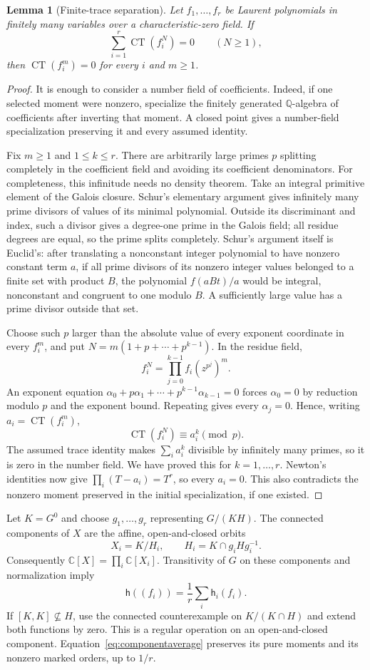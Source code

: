 \documentclass[11pt]{article}
\numberwithin{equation}{section}
\newtheorem{lemma}[theorem]{Lemma}
\theoremstyle{definition}
\theoremstyle{remark}
\newcommand{\C}{\mathbb C}
\newcommand{\Q}{\mathbb Q}
\newcommand{\h}{\mathsf h}
\newcommand{\CT}{\operatorname{CT}}
\begin{document}
\begin{lemma}[Finite-trace separation]\label{lem:finitetrace}
Let $f_1,\ldots,f_r$ be Laurent polynomials in finitely many variables
over a characteristic-zero field. If
\[
 \sum_{i=1}^r\CT(f_i^N)=0\qquad(N\geq1),
\]
then $\CT(f_i^m)=0$ for every $i$ and $m\geq1$.
\end{lemma}
\begin{proof}
It is enough to consider a number field of coefficients. Indeed, if
one selected moment were nonzero, specialize the finitely generated
$\Q$-algebra of coefficients after inverting that moment. A closed
point gives a number-field specialization preserving it and every
assumed identity.

Fix $m\geq1$ and $1\leq k\leq r$. There are arbitrarily large primes
$p$ splitting completely in the coefficient field and avoiding its
coefficient denominators. For completeness, this infinitude needs no
density theorem. Take an integral primitive element of the Galois
closure. Schur's elementary argument gives infinitely many prime
divisors of values of its minimal polynomial. Outside its discriminant
and index, such a divisor gives a degree-one prime in the Galois field;
all residue degrees are equal, so the prime splits completely.
Schur's argument itself is Euclid's: after translating a nonconstant
integer polynomial to have nonzero constant term $a$, if all prime divisors of its nonzero integer values belonged to a finite
set with product $B$, the polynomial
$f(aBt)/a$ would be integral, nonconstant and congruent to one modulo
$B$. A sufficiently large value has a prime divisor outside that set.

Choose such $p$ larger than the absolute value of every exponent
coordinate in every $f_i^m$, and put
$N=m(1+p+\cdots+p^{k-1})$. In the residue field,
\[
 f_i^N=\prod_{j=0}^{k-1}f_i(z^{p^j})^m.
\]
An exponent equation $\alpha_0+p\alpha_1+\cdots+p^{k-1}\alpha_{k-1}=0$
forces $\alpha_0=0$ by reduction modulo $p$ and the exponent bound.
Repeating gives every $\alpha_j=0$. Hence, writing $a_i=\CT(f_i^m)$,
\[
 \CT(f_i^N)\equiv a_i^k\pmod p.
\]
The assumed trace identity makes $\sum_i a_i^k$ divisible by infinitely
many primes, so it is zero in the number field. We have proved this for
$k=1,\ldots,r$. Newton's identities now give
$\prod_i(T-a_i)=T^r$, so every $a_i=0$. This also contradicts the
nonzero moment preserved in the initial specialization, if one existed.
\end{proof}

Let $K=G^0$ and choose $g_1,\ldots,g_r$ representing $G/(KH)$.
The connected components of $X$ are the affine, open-and-closed orbits
\[
 X_i=K/H_i,\qquad H_i=K\cap g_iHg_i^{-1}.
\]
Consequently $\C[X]=\prod_i\C[X_i]$. Transitivity of $G$ on these
components and normalization imply
\begin{equation}\label{eq:componentaverage}
 \h((f_i))=\frac1r\sum_i\h_i(f_i).
\end{equation}
If $[K,K]\not\subseteq H$, use the connected counterexample on
$K/(K\cap H)$ and extend both functions by zero. This is a regular
operation on an open-and-closed component. Equation~\eqref{eq:componentaverage}
preserves its pure moments and its nonzero marked orders, up to $1/r$.
\end{document}
